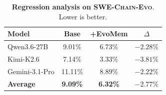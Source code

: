 \documentclass{llmxive}
\providecommand{\arraystretch}{1.05}
\begin{document}
\begin{table}[!htbp]
\centering
\small
\setlength{\tabcolsep}{8pt}
\renewcommand{\arraystretch}{1.18}
\begin{tabular*}{0.78\linewidth}{@{\extracolsep{\fill}}lccc}
\toprule
\textbf{Model} & \textbf{Base} & \textbf{+EvoMem} & \textbf{$\Delta$} \\
\midrule
Qwen3.6-27B & 9.01\% & 6.73\% & $-2.28\%$ \\
Kimi-K2.6 & 7.14\% & 3.33\% & $-3.81\%$ \\
Gemini-3.1-Pro & 11.11\% & 8.89\% & $-2.22\%$ \\
\midrule
\textbf{Average} & \textbf{9.09\%} & \textbf{6.32\%} & \textbf{$-2.77\%$} \\
\bottomrule
\end{tabular*}
\vspace{-1mm}
\caption{\small \textbf{Regression analysis on \textsc{SWE-Chain-Evo}}. Lower is better.}
\label{tab:swe_chain_regression}
\end{table}
\end{document}
